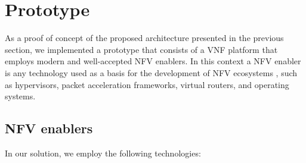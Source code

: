 \section{Prototype}




As a proof of concept of the proposed architecture presented in the previous section, we implemented a prototype that consists of a VNF platform that employs modern and well-accepted NFV enablers. In this context a NFV enabler is any technology used as a basis for the development of NFV ecosystems \cite{ETSI-2012}, such as hypervisors, packet acceleration frameworks, virtual routers, and operating systems.

\subsection{NFV enablers}

In our solution, we employ the following technologies:

